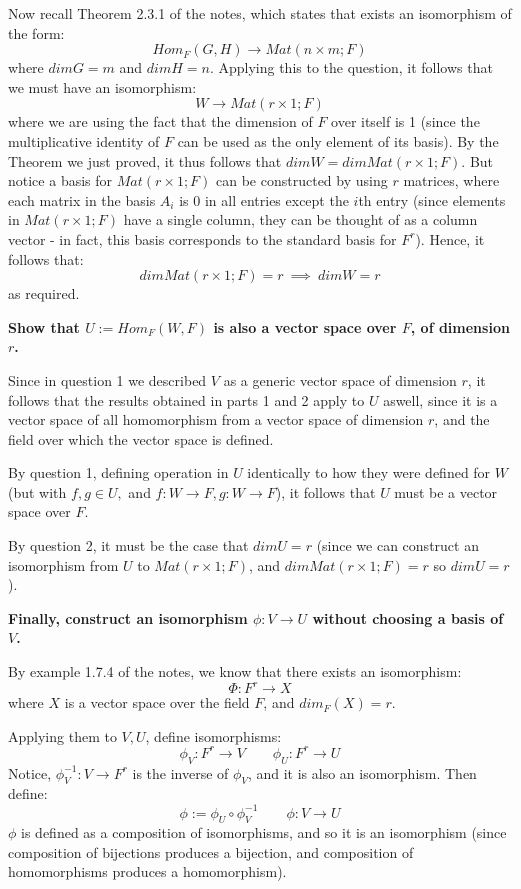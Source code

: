 \documentclass{exam}
\begin{document}
\begin{questions}
\bigskip

Now recall Theorem 2.3.1 of the notes, which states that exists an isomorphism of the form:
\[
Hom_F(G,H) \to Mat(n \times m; F)
\]
where $dim G = m$ and $dim H = n$. Applying this to the question, it follows that we must have an isomorphism:
\[
W \to Mat(r \times 1; F)
\]
where we are using the fact that the dimension of $F$ over itself is 1 (since the multiplicative identity of $F$ can be used as the only element of its basis). By the Theorem we just proved, it thus follows that $dim W = dim Mat(r \times 1; F)$. But notice a basis for $Mat(r \times 1; F)$ can be constructed by using $r$ matrices, where each matrix in the basis $A_i$ is 0 in all entries except the $i$th entry (since elements in $Mat(r \times 1; F)$ have a single column, they can be thought of as a column vector - in fact, this basis corresponds to the standard basis for $F^r$). Hence, it follows that:
\[
dim Mat(r \times 1; F) = r \ \implies \ dim W = r
\]
as required.

\bigskip

\question \textbf{Show that $U := Hom_F(W,F)$ is also a vector space over $F$, of dimension $r$.}

\bigskip

Since in question 1 we described $V$ as a generic vector space of dimension $r$, it follows that the results obtained in parts 1 and 2 apply to $U$ aswell, since it is a vector space of all homomorphism from a vector space of dimension $r$, and the field over which the vector space is defined.

By question 1, defining operation in $U$ identically to how they were defined for $W$ (but with $f,g \in U,$ and $f : W \to F, g : W \to F$), it follows that $U$ must be a vector space over $F$.

By question 2, it must be the case that $dim U = r$ (since we can construct an isomorphism from $U$ to $Mat(r \times 1; F)$, and $dim Mat(r \times 1; F) = r$ so $dim U = r$).

\bigskip

\question \textbf{Finally, construct an isomorphism $\phi : V \to U$ without choosing a basis of $V$.}

\bigskip

By example 1.7.4 of the notes, we know that there exists an isomorphism:
\[
\Phi : F^r \to X 
\]
where $X$ is a vector space over the field $F$, and $dim_F(X) = r$.

Applying them to $V,U$, define isomorphisms:
\[
\phi_V : F^r \to V \qquad \phi_U : F^r \to U
\]
Notice, $\phi_V^{-1} : V \to F^r$ is the inverse of $\phi_V$, and it is also an isomorphism. Then define:
\[
\phi := \phi_U \circ \phi_V^{-1} \qquad \phi : V \to U
\]
$\phi$ is defined as a composition of isomorphisms, and so it is an isomorphism (since composition of bijections produces a bijection, and composition of homomorphisms produces a homomorphism).


\end{questions}
\end{document}
